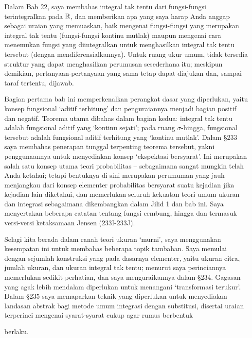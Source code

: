 

\def\chaptername{Teorema Radon-Nikod\'ym}
\def\chaptername{Teorema Radon-Nikod\'ym}

Dalam Bab 22, saya membahas integral tak tentu dari fungsi-fungsi
terintegralkan pada $\Bbb R$, dan memberikan apa yang saya harap Anda anggap
sebagai uraian yang memuaskan, baik mengenai
fungsi-fungsi yang merupakan integral tak tentu (fungsi-fungsi kontinu
mutlak) maupun mengenai cara menemukan fungsi yang diintegralkan untuk
menghasilkan integral tak tentu tersebut (dengan mendiferensialkannya).
Untuk ruang ukur umum, tidak tersedia struktur yang dapat menghasilkan
perumusan sesederhana itu; meskipun demikian, pertanyaan-pertanyaan yang sama
tetap dapat diajukan dan, sampai taraf tertentu, dijawab.

Bagian pertama bab ini memperkenalkan perangkat dasar yang diperlukan,
yaitu konsep fungsional `aditif terhitung' dan penguraiannya menjadi bagian
positif dan negatif. Teorema utama dibahas dalam bagian kedua: integral tak
tentu adalah fungsional aditif yang `kontinu sejati'; pada ruang
$\sigma$-hingga, fungsional tersebut adalah fungsional aditif terhitung yang
`kontinu mutlak'. Dalam \S233 saya membahas penerapan tunggal terpenting
teorema tersebut, yakni penggunaannya untuk menyediakan konsep `ekspektasi
bersyarat'. Ini merupakan salah satu konsep utama teori probabilitas --
sebagaimana sangat mungkin telah Anda ketahui; tetapi bentuknya di sini
merupakan perumuman yang jauh menjangkau dari konsep elementer probabilitas
bersyarat suatu kejadian jika kejadian lain diketahui, dan memerlukan seluruh
kekuatan teori umum ukuran dan integrasi sebagaimana dikembangkan dalam Jilid
1 dan bab ini. Saya menyertakan beberapa catatan tentang fungsi cembung,
hingga dan termasuk versi-versi ketaksamaan Jensen (233I-233J).

Selagi kita berada dalam ranah teori ukuran `murni', saya menggunakan
kesempatan ini untuk membahas beberapa topik tambahan.
Saya memulai dengan sejumlah konstruksi yang pada dasarnya elementer,
yaitu ukuran citra, jumlah ukuran, dan ukuran integral tak tentu;
menurut saya perinciannya memerlukan sedikit perhatian,
dan saya menguraikannya dalam \S234.
Gagasan yang agak lebih mendalam diperlukan untuk menangani `transformasi
terukur'. Dalam \S235 saya memaparkan teknik yang diperlukan untuk menyediakan
landasan abstrak bagi metode umum integrasi dengan substitusi, disertai
uraian terperinci mengenai syarat-syarat cukup agar rumus berbentuk


\noindent berlaku.

\discrpage
